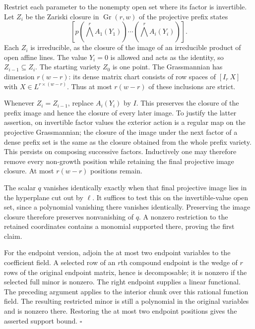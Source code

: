 Restrict each parameter to the nonempty open set where its
factor is invertible.  Let $Z_i$ be the Zariski closure in
$\operatorname{Gr}(r,w)$ of the projective prefix states
\[
 [p(\textstyle\bigwedge^r A_1(Y_1))\cdots
        (\textstyle\bigwedge^r A_i(Y_i))].
\]
Each $Z_i$ is irreducible, as the closure of the image of an
irreducible product of open affine lines.  The value $Y_i=0$
is allowed and acts as the identity, so
$Z_{i-1}\subseteq Z_i$.  The starting variety $Z_0$ is one
point.  The Grassmannian has dimension $r(w-r)$: its dense
matrix chart consists of row spaces of $[I_r\ X]$ with
$X\in L^{r\times(w-r)}$.
Thus at most $r(w-r)$ of these inclusions are strict.

Whenever $Z_i=Z_{i-1}$, replace $A_i(Y_i)$ by $I$.
This preserves the closure of the prefix image and hence the
closure of every later image.  To justify the latter assertion,
on invertible factor values the exterior action is a regular
map on the projective Grassmannian; the closure of the image
under the next factor of a dense prefix set is the same as
the closure obtained from the whole prefix variety.  This
persists on composing successive factors.  Inductively one
may therefore remove every non-growth position while retaining
the final projective image closure.  At most $r(w-r)$ positions
remain.

The scalar $q$ vanishes identically exactly when that final
projective image lies in the hyperplane cut out by $\ell$.
It suffices to test this on the invertible-value open set,
since a polynomial vanishing there vanishes identically.
Preserving the image closure therefore preserves nonvanishing
of $q$.  A nonzero restriction to the retained coordinates
contains a monomial supported there, proving the first claim.

For the endpoint version, adjoin the at most two endpoint
variables to the coefficient field.  A selected row of an
$r$th compound endpoint is the wedge of $r$ rows of the
original endpoint matrix, hence is decomposable; it is nonzero
if the selected full minor is nonzero.  The right endpoint
supplies a linear functional.  The preceding argument applies
to the interior chunk over this rational function field.
The resulting restricted minor is still a polynomial in the
original variables and is nonzero there.  Restoring the at
most two endpoint positions gives the asserted support bound.
\hfill$\square$

